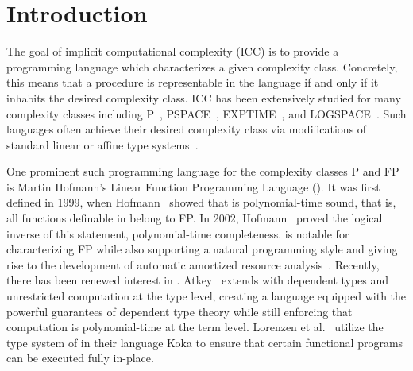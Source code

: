 \section{Introduction}

The goal of implicit computational complexity (ICC) is to provide a programming language which characterizes a given complexity class. Concretely, this means that a procedure is representable in the language if and only if it inhabits the desired complexity class. ICC has been extensively studied for many complexity classes including P~\cite{hofmannLinearTypesNonsizeincreasing1999,hofmannTypeSystemBounded2000,hofmannLinearTypesNonsizeincreasing2003,gaboardiSoftLinearLogic2008}, PSPACE~\cite{hofmannLinearTypesNonsizeincreasing2003, gaboardiSoftLinearLogic2008,gaboardiImplicitCharacterizationPSPACE2012}, EXPTIME~\cite{hofmannStrengthNonsizeIncreasing2002}, and LOGSPACE~\cite{schoppStratifiedBoundedAffine2007, ramyaaRamifiedCorecurrenceLogspace2011}. Such languages often achieve their desired complexity class via modifications of standard linear or affine type systems~\cite{dallagoImplicitComputationComplexity2022}.

One prominent such programming language for the complexity classes P and FP is Martin Hofmann's Linear Function Programming Language (\lfpl).
%
It was first defined in 1999, when Hofmann~\cite{hofmannLinearTypesNonsizeincreasing1999} showed that \lfpl is polynomial-time sound, that is, all functions definable in \lfpl belong to FP.
%
In 2002, Hofmann~\cite{hofmannStrengthNonsizeIncreasing2002} proved the logical inverse of this statement, polynomial-time completeness.
%
\lfpl is notable for characterizing FP while also supporting a natural programming style and giving rise to the development of automatic amortized resource analysis~\cite{HoffmJ22}.
%
Recently, there has been renewed interest in \lfpl. Atkey~\cite{atkeyPolynomialTimeDependent2024} extends \lfpl with dependent
types and unrestricted computation at the type level, creating a
language equipped with the powerful guarantees of dependent type
theory while still enforcing that computation is polynomial-time at
the term level. Lorenzen et al.~\cite{lorenzenFP2FullyInPlace2023}
utilize the type system of \lfpl in their language Koka to ensure
that certain functional programs can be executed fully in-place.


